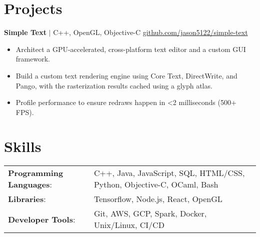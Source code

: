 \documentclass[11pt]{article}
\begin{document}
\section{Projects}
\textbf{Simple Text} $|$ {\small C++, OpenGL, Objective-C} \hfill {\small \href{https://github.com/jason5122/simple-text}{github.com/jason5122/simple-text}}
\par
\begin{itemize}
  \item Architect a GPU-accelerated, cross-platform text editor and a custom GUI framework.
  \item Build a custom text rendering engine using Core Text, DirectWrite, and Pango, with the rasterization results cached using a glyph atlas.
  \item Profile performance to ensure redraws happen in <2 milliseconds (500+ FPS).
\end{itemize}

\section{Skills}
\begin{tabular}{@{}ll}
  \textbf{Programming Languages}: & C++, Java, JavaScript, SQL, HTML/CSS, Python, Objective-C, OCaml, Bash \\
  \textbf{Libraries}:             & Tensorflow, Node.js, React, OpenGL                                     \\
  \textbf{Developer Tools}:       & Git, AWS, GCP, Spark, Docker, Unix/Linux, CI/CD
\end{tabular}
\end{document}
